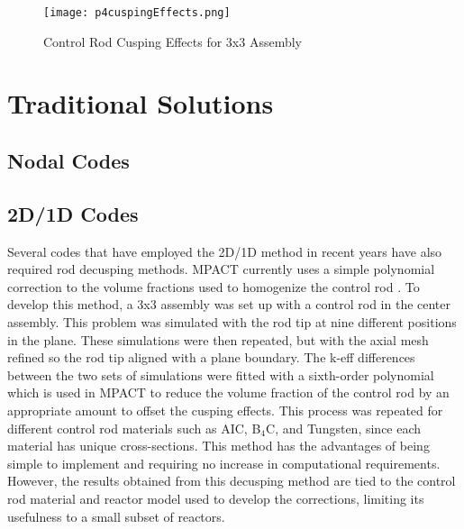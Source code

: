 \begin{figure}
    \centering
    \texttt{[image: p4cuspingEffects.png]}
    \caption{Control Rod Cusping Effects for 3x3 Assembly}\label{f:p4cuspingEffects}
\end{figure}

\section{Traditional Solutions}

\subsection{Nodal Codes}


\subsection{2D/1D Codes}

Several codes that have employed the 2D/1D method in recent years have also required rod decusping methods.  MPACT currently uses a simple polynomial correction to the volume fractions used to homogenize the control rod \cite{MC2015_VCS_Cycle_Depletion}.  To develop this method, a 3x3 assembly was set up with a control rod in the center assembly.  This problem was simulated with the rod tip at nine different positions in the plane.  These simulations were then repeated, but with the axial mesh refined so the rod tip aligned with a plane boundary.  The k-eff differences between the two sets of simulations were fitted with a sixth-order polynomial which is used in MPACT to reduce the volume fraction of the control rod by an appropriate amount to offset the cusping effects.  This process was repeated for different control rod materials such as AIC, B$_4$C, and Tungsten, since each material has unique cross-sections.  This method has the advantages of being simple to implement and requiring no increase in computational requirements.  However, the results obtained from this decusping method are tied to the control rod material and reactor model used to develop the corrections, limiting its usefulness to a small subset of reactors.

